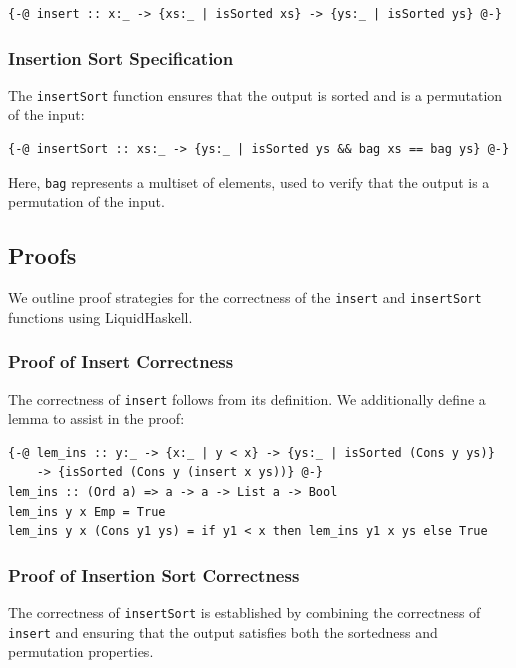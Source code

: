 \documentclass[]{rptuseminar}
\begin{document}
\begin{lstlisting}[caption=Insert Specification]
{-@ insert :: x:_ -> {xs:_ | isSorted xs} -> {ys:_ | isSorted ys} @-}
\end{lstlisting}

\subsubsection{Insertion Sort Specification}

The \texttt{insertSort} function ensures that the output is sorted and is a permutation of the input:

\begin{lstlisting}[caption=Insertion Sort Specification]
{-@ insertSort :: xs:_ -> {ys:_ | isSorted ys && bag xs == bag ys} @-}
\end{lstlisting}

Here, \texttt{bag} represents a multiset of elements, used to verify that the output is a permutation of the input.

\subsection{Proofs}

We outline proof strategies for the correctness of the \texttt{insert} and \texttt{insertSort} functions using LiquidHaskell.

\subsubsection{Proof of Insert Correctness}

The correctness of \texttt{insert} follows from its definition. We additionally define a lemma to assist in the proof:

\begin{lstlisting}[caption=Insert Lemma]
{-@ lem_ins :: y:_ -> {x:_ | y < x} -> {ys:_ | isSorted (Cons y ys)} 
    -> {isSorted (Cons y (insert x ys))} @-}
lem_ins :: (Ord a) => a -> a -> List a -> Bool
lem_ins y x Emp = True
lem_ins y x (Cons y1 ys) = if y1 < x then lem_ins y1 x ys else True
\end{lstlisting}

\subsubsection{Proof of Insertion Sort Correctness}

The correctness of \texttt{insertSort} is established by combining the correctness of \texttt{insert} and ensuring that the output satisfies both the sortedness and permutation properties.
\end{document}
